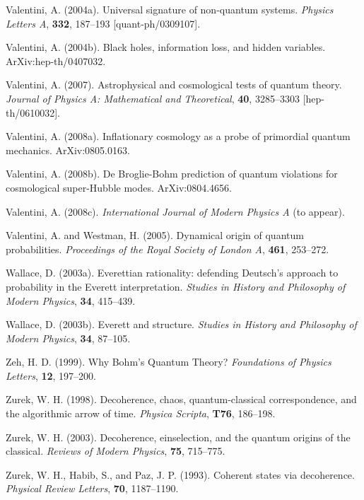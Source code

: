 \documentclass[12pt]{article}%
\begin{document}
Valentini, A. (2004a). Universal signature of non-quantum systems.
\textit{Physics Letters A}, \textbf{332}, 187--193 [quant-ph/0309107].

Valentini, A. (2004b). Black holes, information loss, and hidden variables. ArXiv:hep-th/0407032.

Valentini, A. (2007). Astrophysical and cosmological tests of quantum theory.
\textit{Journal of Physics A: Mathematical and Theoretical}, \textbf{40},
3285--3303 [hep-th/0610032].

Valentini, A. (2008a). Inflationary cosmology as a probe of primordial quantum
mechanics. ArXiv:0805.0163.

Valentini, A. (2008b). De Broglie-Bohm prediction of quantum violations for
cosmological super-Hubble modes. ArXiv:0804.4656.

Valentini, A. (2008c). \textit{International Journal of Modern Physics A} (to appear).

Valentini, A. and Westman, H. (2005). Dynamical origin of quantum
probabilities. \textit{Proceedings of the Royal Society of London A},
\textbf{461}, 253--272.

Wallace, D. (2003a). Everettian rationality: defending Deutsch's approach to
probability in the Everett interpretation. \textit{Studies in History and
Philosophy of Modern Physics}, \textbf{34}, 415--439.

Wallace, D. (2003b). Everett and structure. \textit{Studies in History and
Philosophy of Modern Physics}, \textbf{34}, 87--105.

Zeh, H. D. (1999). Why Bohm's Quantum Theory? \textit{Foundations of Physics
Letters}, \textbf{12}, 197--200.

Zurek, W. H. (1998). Decoherence, chaos, quantum-classical correspondence, and
the algorithmic arrow of time. \textit{Physica Scripta}, \textbf{T76}, 186--198.

Zurek, W. H. (2003). Decoherence, einselection, and the quantum origins of the
classical. \textit{Reviews of Modern Physics}, \textbf{75}, 715--775.

Zurek, W. H., Habib, S., and Paz, J. P. (1993). Coherent states via
decoherence. \textit{Physical Review Letters}, \textbf{70}, 1187--1190.
\end{document}
